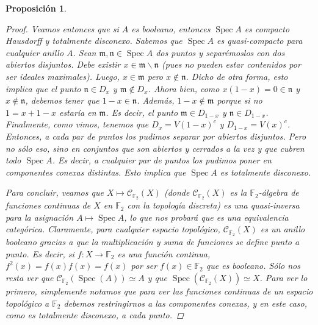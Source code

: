 \documentclass[11pt,a4paper, spanish,oneside,fleqn]{article}
\newtheorem{prop}[teo]{Proposición}
\theoremstyle{definition}
\newcommand{\FF}{\mathbb{F}}
\DeclareMathOperator{\spec}{Spec}
\begin{document}
\begin{prop}
\begin{proof}
Veamos entonces que si $A$ es booleano, entonces $\spec A$ es compacto Hausdorff y totalmente disconexo. Sabemos que $\spec A$ es quasi-compacto para cualquier anillo $A$. Sean $\mathfrak{m},\mathfrak{n}\in\spec A$ dos puntos y separémoslos con dos abiertos disjuntos. Debe existir $x\in \mathfrak{m}\backslash \mathfrak{n}$ (pues no pueden estar contenidos por ser ideales maximales). Luego, $x\in \mathfrak{m}$ pero $x\notin\mathfrak{n}$. Dicho de otra forma, esto implica que el punto $\mathfrak{n}\in D_{x}$ y $\mathfrak{m}\notin D_x$. Ahora bien, como $x(1-x)=0\in\mathfrak{n}$ y $x\notin\mathfrak{n}$, debemos tener que $1-x\in\mathfrak{n}$. Además, $1-x\notin\mathfrak{m}$ porque si no $1 = x + 1-x$ estaría en $\mathfrak{m}$. Es decir, el punto $\mathfrak{m}\in D_{1-x}$ y $\mathfrak{n}\in D_{1-x}$. Finalmente, como vimos, tenemos que $D_x = V(1-x)^c$ y $D_{1-x} = V(x)^c$. Entonces, a cada par de puntos los pudimos separar por abiertos disjuntos. Pero no sólo eso, sino en conjuntos que son abiertos y cerrados a la vez y que cubren todo $\spec A$. Es decir, a cualquier par de puntos los pudimos poner en componentes conexas distintas. Esto implica que $\spec A$ es totalmente disconexo.

Para concluir, veamos que $X\mapsto \mathscr{C}_{\FF_2}(X)$ (donde $\mathscr{C}_{\FF_2}(X)$ es la $\FF_2$-álgebra de funciones continuas de $X$ en $\FF_2$ con la topología discreta) es una quasi-inversa para la asignación $A\mapsto \spec A$, lo que nos probará que es una equivalencia categórica. Claramente, para cualquier espacio topológico, $\mathscr{C}_{\FF_2}(X)$ es un anillo booleano gracias a que la multiplicación y suma de funciones se define punto a punto. Es decir, si $f:X\to\FF_2$ es una función continua, $f^2(x) = f(x)f(x) = f(x)$ por ser $f(x)\in\FF_2$ que es booleano. Sólo nos resta ver que $\mathscr{C}_{\FF_2}(\spec(A)) \simeq A$ y que $\spec(\mathscr{C}_{\FF_2}(X))\simeq X$. Para ver lo primero, simplemente notamos que para ver las funciones continuas de un espacio topológico a $\FF_2$ debemos restringirnos a las componentes conexas, y en este caso, como es totalmente disconexo, a cada punto.


\end{proof}
\end{prop}
\end{document}
